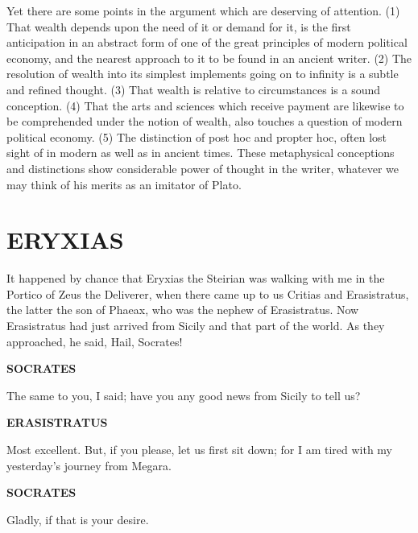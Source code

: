 \documentclass[11pt,letter]{article}
\begin{document}
\par  Yet there are some points in the argument which are deserving of attention. (1) That wealth depends upon the need of it or demand for it, is the first anticipation in an abstract form of one of the great principles of modern political economy, and the nearest approach to it to be found in an ancient writer. (2) The resolution of wealth into its simplest implements going on to infinity is a subtle and refined thought. (3) That wealth is relative to circumstances is a sound conception. (4) That the arts and sciences which receive payment are likewise to be comprehended under the notion of wealth, also touches a question of modern political economy. (5) The distinction of post hoc and propter hoc, often lost sight of in modern as well as in ancient times. These metaphysical conceptions and distinctions show considerable power of thought in the writer, whatever we may think of his merits as an imitator of Plato.

\par 
\section{
      ERYXIAS
    }  
\par  It happened by chance that Eryxias the Steirian was walking with me in the Portico of Zeus the Deliverer, when there came up to us Critias and Erasistratus, the latter the son of Phaeax, who was the nephew of Erasistratus. Now Erasistratus had just arrived from Sicily and that part of the world. As they approached, he said, Hail, Socrates!

\par \textbf{SOCRATES}
\par   The same to you, I said; have you any good news from Sicily to tell us?

\par \textbf{ERASISTRATUS}
\par   Most excellent. But, if you please, let us first sit down; for I am tired with my yesterday's journey from Megara.

\par \textbf{SOCRATES}
\par   Gladly, if that is your desire.
\end{document}
